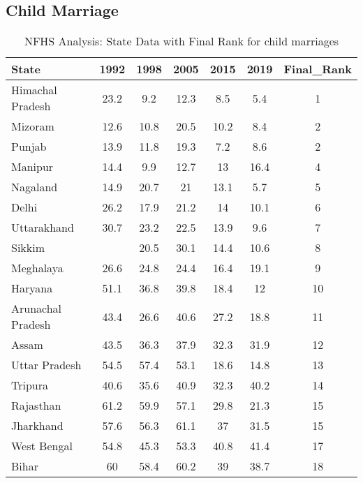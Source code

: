 \subsection{Child Marriage}
\begin{table}[h!]
\centering
\begin{tabular}{lcccccc}
\toprule
State             & 1992 & 1998 & 2005 & 2015 & 2019 & Final\_Rank \\
\midrule
Himachal Pradesh  & 23.2 & 9.2  & 12.3 & 8.5  & 5.4  & 1          \\
Mizoram           & 12.6 & 10.8 & 20.5 & 10.2 & 8.4  & 2          \\
Punjab            & 13.9 & 11.8 & 19.3 & 7.2  & 8.6  & 2          \\
Manipur           & 14.4 & 9.9  & 12.7 & 13   & 16.4 & 4          \\
Nagaland          & 14.9 & 20.7 & 21   & 13.1 & 5.7  & 5          \\
Delhi             & 26.2 & 17.9 & 21.2 & 14   & 10.1 & 6          \\
Uttarakhand       & 30.7 & 23.2 & 22.5 & 13.9 & 9.6  & 7          \\
Sikkim            &      & 20.5 & 30.1 & 14.4 & 10.6 & 8          \\
Meghalaya         & 26.6 & 24.8 & 24.4 & 16.4 & 19.1 & 9          \\
Haryana           & 51.1 & 36.8 & 39.8 & 18.4 & 12   & 10         \\
Arunachal Pradesh & 43.4 & 26.6 & 40.6 & 27.2 & 18.8 & 11         \\
Assam             & 43.5 & 36.3 & 37.9 & 32.3 & 31.9 & 12         \\
Uttar Pradesh     & 54.5 & 57.4 & 53.1 & 18.6 & 14.8 & 13         \\
Tripura           & 40.6 & 35.6 & 40.9 & 32.3 & 40.2 & 14         \\
Rajasthan         & 61.2 & 59.9 & 57.1 & 29.8 & 21.3 & 15         \\
Jharkhand         & 57.6 & 56.3 & 61.1 & 37   & 31.5 & 15         \\
West Bengal       & 54.8 & 45.3 & 53.3 & 40.8 & 41.4 & 17         \\
Bihar             & 60   & 58.4 & 60.2 & 39   & 38.7 & 18         \\
\bottomrule
\end{tabular}
\caption{NFHS Analysis: State Data with Final Rank for child marriages}
\label{tab:child_marriage}
\end{table}


